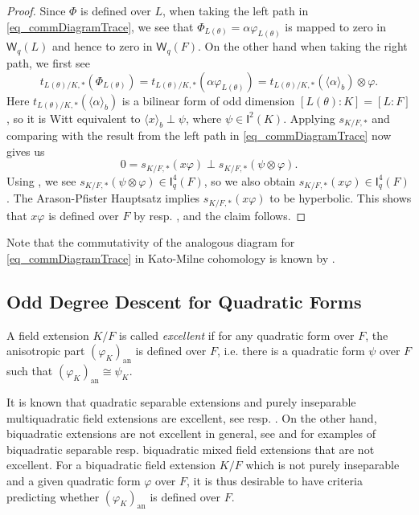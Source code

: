 \documentclass{amsart}
\numberwithin{equation}{section}
\newcommand{\an}{\mathrm{an}} %
\newcommand{\bif}[1]{\langle #1 \rangle_b}
\newcommand{\I}{\mathsf{I}}
\newcommand{\W}{\mathsf{W}}
\begin{document}
\begin{proof}
    Since $\Phi$ is defined over $L$, when taking the left path in \eqref{eq_commDiagramTrace}, we see that $\Phi_{L(\theta)} = \alpha\varphi_{L(\theta)}$ is mapped to zero in $\W_q(L)$ and hence to zero in $\W_q(F)$.
    On the other hand when taking the right path, we first see
    \[t_{L(\theta)/K, \ast}(\Phi_{L(\theta)}) = t_{L(\theta)/K, \ast}(\alpha\varphi_{L(\theta)}) = t_{L(\theta)/K, \ast}(\bif{\alpha}) \otimes \varphi.\]
    Here $t_{L(\theta)/K, \ast}(\bif{\alpha})$ is a bilinear form of odd dimension $[L(\theta) : K] = [L : F]$, so it is Witt equivalent to $\bif{x} \perp \psi$, where $\psi \in \I^2(K)$.
    Applying $s_{K/F, \ast}$ and comparing with the result from the left path in \eqref{eq_commDiagramTrace} now gives us 
    \[0 = s_{K/F, \ast}(x\varphi) \perp s_{K/F, \ast}(\psi \otimes \varphi).\]
    Using \cite[Corollary 21.5]{ElmanKarpenkoMerkurjev2008}, we see $s_{K/F, \ast}(\psi \otimes \varphi) \in \I_q^4(F)$, so we also obtain $s_{K/F, \ast}(x\varphi) \in \I_q^4(F)$.
    The Arason-Pfister Hauptsatz implies $s_{K/F, \ast}(x\varphi)$ to be hyperbolic.
    This shows that $x\varphi$ is defined over $F$ by \cite[Theorem 34.9]{ElmanKarpenkoMerkurjev2008} resp. , and the claim follows.
\end{proof}

Note that the commutativity of the analogous diagram for \eqref{eq_commDiagramTrace} in Kato-Milne cohomology is known by \cite[Theorem 2.5]{AravireLaghribiORyan_TransferInsep}.

\subsection*{Odd Degree Descent for Quadratic Forms} %

A field extension $K / F$ is called \emph{excellent} if for any quadratic form over $F$, the anisotropic part $(\varphi_K)_\an$ is defined over $F$, i.e. there is a quadratic form $\psi$ over $F$ such that $(\varphi_K)_\an \cong \psi_K$. 

It is known that quadratic separable extensions and purely inseparable multiquadratic field extensions are excellent, see \cite[Corollary 22.12]{ElmanKarpenkoMerkurjev2008} resp. \cite[Theorem 3.4]{Hof4}.
On the other hand, biquadratic extensions are not excellent in general, see \cite[Example 6.1]{LaghribiMukhija_ExcellenceInsepQuartic} and \cite[Example 3.3]{BingolChapmanLaghribi_MixedSplittingFields} for examples of biquadratic separable resp. biquadratic mixed field extensions that are not excellent.
For a biquadratic field extension $K / F$ which is not purely inseparable and a given quadratic form $\varphi$ over $F$, it is thus desirable to have criteria predicting whether $(\varphi_K)_\an$ is defined over $F$.
\end{document}
